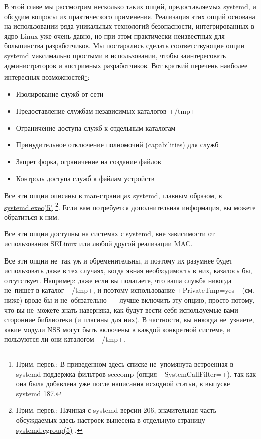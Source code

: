 \documentclass[10pt,oneside,a4paper]{article}
\begin{document}
В этой главе мы рассмотрим несколько таких опций, предоставляемых systemd, и
обсудим вопросы их практического применения. Реализация этих опций основана на
использовании ряда уникальных технологий безопасности, интегрированных в ядро
Linux уже очень давно, но при этом практически неизвестных для большинства
разработчиков. Мы постарались сделать соответствующие опции systemd максимально
простыми в использовании, чтобы заинтересовать администраторов и апстримных
разработчиков. Вот краткий перечень наиболее интересных
возможностей\footnote{Прим. перев.: В приведенном здесь списке не~упомянута
встроенная в systemd поддержка фильтров seccomp (опция +SystemCallFilter=+),
так как она была добавлена уже после написания исходной статьи, в выпуске
systemd 187.}:
\begin{itemize}
	\item Изолирование служб от сети
	\item Предоставление службам независимых каталогов +/tmp+
	\item Ограничение доступа служб к отдельным каталогам
	\item Принудительное отключение полномочий (capabilities) для служб
	\item Запрет форка, ограничение на создание файлов
	\item Контроль доступа служб к файлам устройств
\end{itemize}

Все эти опции описаны в man-страницах systemd, главным образом, в
\href{http://0pointer.de/public/systemd-man/systemd.exec.html}{systemd.exec(5)}%
\footnote{Прим. перев.: Начиная с systemd версии 206, значительная часть
обсуждаемых здесь настроек вынесена в отдельную страницу
\href{http://0pointer.de/public/systemd-man/systemd.cgroup.html}{systemd.cgroup(5)}%
.}. Если вам потребуется дополнительная информация, вы можете обратиться к ним.

Все эти опции доступны на системах с systemd, вне зависимости от использования
SELinux или любой другой реализации MAC.

Все эти опции не~так уж и обременительны, и поэтому их разумнее будет
использовать даже в тех случаях, когда явная необходимость в них, казалось бы,
отсутствует. Например: даже если вы полагаете, что ваша служба никогда не~пишет
в каталог +/tmp+, и поэтому использование +PrivateTmp=yes+ (см. ниже) вроде бы и
не~обязательно~--- лучше включить эту опцию, просто потому, что вы не~можете
знать наверняка, как будут вести себя используемые вами сторонние библиотеки (и
плагины для них). В частности, вы никогда не~узнаете, какие модули NSS могут
быть включены в каждой конкретной системе, и пользуются ли они каталогом +/tmp+.
\end{document}
